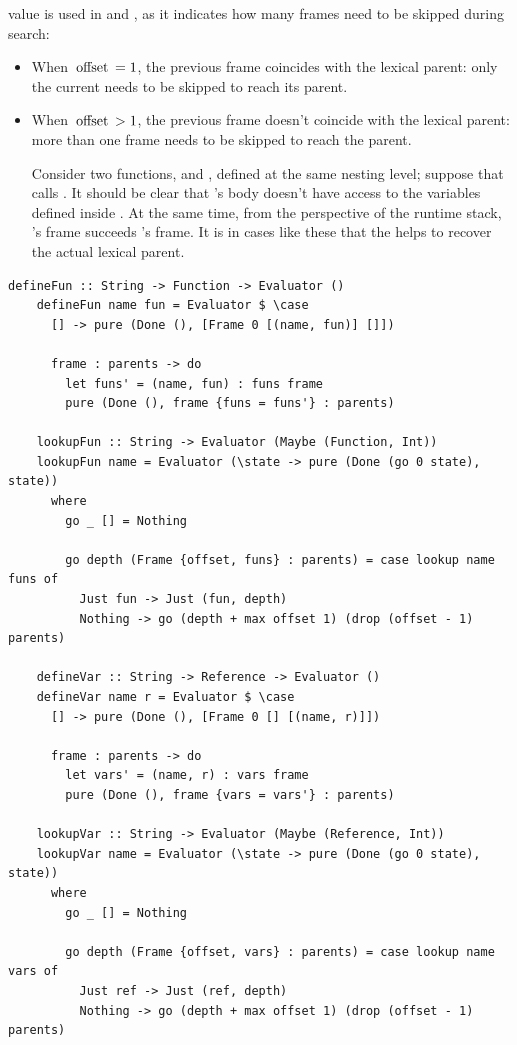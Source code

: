 \documentclass[UdineBachThesis,american,11pt]{PhdThesis}
\begin{document}
  \pagebreak

  value is used in \lstinline@lookupFun@ and \lstinline@lookupVar@, as it
  indicates how many frames need to be skipped during search:

  \begin{itemize}
    \item When $\text{\lstinline@offset@} = 1$, the previous frame coincides
    with the lexical parent: only the current needs to be skipped to reach its
    parent.

    \item When $\text{\lstinline@offset@} > 1$, the previous frame doesn't
    coincide with the lexical parent: more than one frame needs to be skipped to
    reach the parent.

    Consider two functions, \lstinline@f@ and \lstinline@g@, defined at the same
    nesting level; suppose that \lstinline@f@ calls \lstinline@g@. It should be
    clear that \lstinline@g@'s body doesn't have access to the variables defined
    inside \lstinline@f@. At the same time, from the perspective of the runtime
    stack, \lstinline@g@'s frame succeeds \lstinline@f@'s frame. It is in cases
    like these that the \lstinline@offset@ helps to recover the actual lexical
    parent.
  \end{itemize}

  \begin{lstlisting}[gobble=4,basicstyle=\ttfamily\small]
    defineFun :: String -> Function -> Evaluator ()
    defineFun name fun = Evaluator $ \case
      [] -> pure (Done (), [Frame 0 [(name, fun)] []])

      frame : parents -> do
        let funs' = (name, fun) : funs frame
        pure (Done (), frame {funs = funs'} : parents)

    lookupFun :: String -> Evaluator (Maybe (Function, Int))
    lookupFun name = Evaluator (\state -> pure (Done (go 0 state), state))
      where
        go _ [] = Nothing

        go depth (Frame {offset, funs} : parents) = case lookup name funs of
          Just fun -> Just (fun, depth)
          Nothing -> go (depth + max offset 1) (drop (offset - 1) parents)

    defineVar :: String -> Reference -> Evaluator ()
    defineVar name r = Evaluator $ \case
      [] -> pure (Done (), [Frame 0 [] [(name, r)]])

      frame : parents -> do
        let vars' = (name, r) : vars frame
        pure (Done (), frame {vars = vars'} : parents)

    lookupVar :: String -> Evaluator (Maybe (Reference, Int))
    lookupVar name = Evaluator (\state -> pure (Done (go 0 state), state))
      where
        go _ [] = Nothing

        go depth (Frame {offset, vars} : parents) = case lookup name vars of
          Just ref -> Just (ref, depth)
          Nothing -> go (depth + max offset 1) (drop (offset - 1) parents)
  \end{lstlisting}
\end{document}
